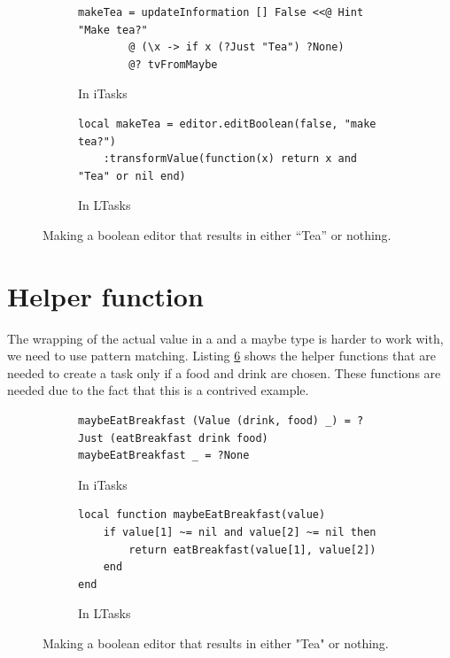 \begin{figure}[ht]
\begin{subfigure}{\textwidth}
\centering
\begin{verbatim}
makeTea = updateInformation [] False <<@ Hint "Make tea?"
        @ (\x -> if x (?Just "Tea") ?None)
        @? tvFromMaybe
\end{verbatim}
\caption{In iTasks}
\label{lst:comparison_editors_clean}
\end{subfigure}
\begin{subfigure}{\textwidth}
\centering
\bigskip %
\begin{verbatim}
local makeTea = editor.editBoolean(false, "make tea?")
    :transformValue(function(x) return x and "Tea" or nil end)
\end{verbatim}
\caption{In LTasks}
\label{lst:comparison_editors_lua}
\end{subfigure}
\caption{Making a boolean editor that results in either ``Tea'' or nothing.}
\label{lst:comparison_editors}
\end{figure}

\section{Helper function}
The wrapping of the actual value in a  and a maybe type is harder to work with, we need to use pattern matching. Listing \ref{lst:comparison_maybe} shows the helper functions that are needed to create a  task only if a food and drink are chosen. These functions are needed due to the fact that this is a contrived example.

\begin{figure}[ht]
\begin{subfigure}{\textwidth}
\centering
\begin{verbatim}
maybeEatBreakfast (Value (drink, food) _) = ?Just (eatBreakfast drink food)
maybeEatBreakfast _ = ?None
\end{verbatim}
\caption{In iTasks}
\label{lst:comparison_maybe_clean}
\end{subfigure}
\begin{subfigure}{\textwidth}
\centering
\bigskip %
\begin{verbatim}
local function maybeEatBreakfast(value)
    if value[1] ~= nil and value[2] ~= nil then
        return eatBreakfast(value[1], value[2])
    end
end
\end{verbatim}
\caption{In LTasks}
\label{lst:comparison_maybe_lua}
\end{subfigure}
\caption{Making a boolean editor that results in either "Tea" or nothing.}
\label{lst:comparison_maybe}
\end{figure}

